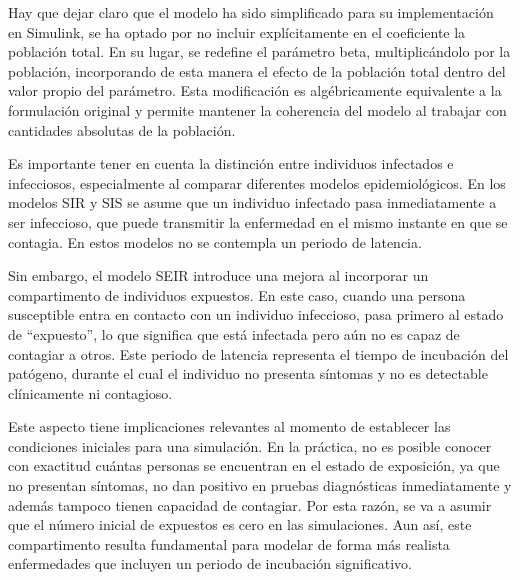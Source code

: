 Hay que dejar claro que el modelo ha sido simplificado para su implementación en Simulink, se ha optado por no incluir explícitamente en el coeficiente la población total. En su lugar, se redefine el parámetro beta, multiplicándolo por la población, incorporando de esta manera el efecto de la población total dentro del valor propio del parámetro. Esta modificación es algébricamente equivalente a la formulación original y permite mantener la coherencia del modelo al trabajar con cantidades absolutas de la población. 

Es importante tener en cuenta la distinción entre individuos infectados e infecciosos, especialmente al comparar diferentes modelos epidemiológicos. En los modelos SIR y SIS se asume que un individuo infectado pasa inmediatamente a ser infeccioso, que puede transmitir la enfermedad en el mismo instante en que se contagia. En estos modelos no se contempla un periodo de latencia.

Sin embargo, el modelo SEIR introduce una mejora al incorporar un compartimento de individuos expuestos. En este caso, cuando una persona susceptible entra en contacto con un individuo infeccioso, pasa primero al estado de “expuesto”, lo que significa que está infectada pero aún no es capaz de contagiar a otros. Este periodo de latencia representa el tiempo de incubación del patógeno, durante el cual el individuo no presenta síntomas y no es detectable clínicamente ni contagioso.

Este aspecto tiene implicaciones relevantes al momento de establecer las condiciones iniciales para una simulación. En la práctica, no es posible conocer con exactitud cuántas personas se encuentran en el estado de exposición, ya que no presentan síntomas, no dan positivo en pruebas diagnósticas inmediatamente y además tampoco tienen capacidad de contagiar.
Por esta razón, se va a asumir que el número inicial de expuestos es cero en las simulaciones. Aun así, este compartimento resulta fundamental para modelar de forma más realista enfermedades que incluyen un periodo de incubación significativo.


